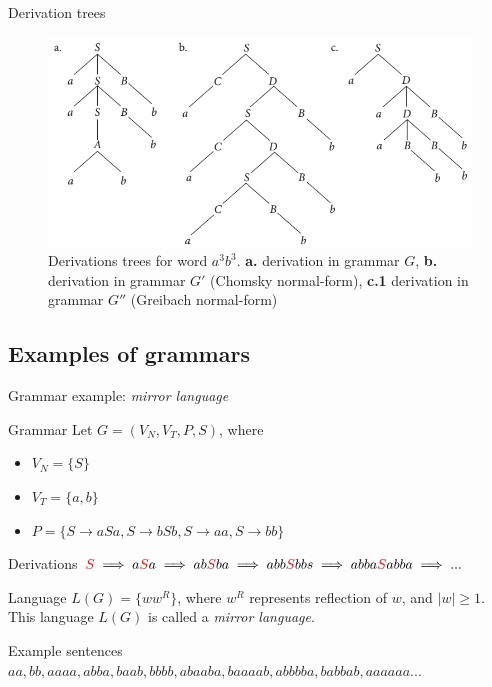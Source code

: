 \documentclass{beamer}
\begin{document}
\begin{frame}{Derivation trees}
\begin{figure}
\includegraphics[width=\textwidth]{img/derivation_tree_2.png}
\caption{\label{fig:derivation-trees}Derivations trees for word $a^3b^3$. \textbf{a.} derivation in grammar $G$, \textbf{b.} derivation in grammar $G'$ (Chomsky normal-form), \textbf{c.1} derivation in grammar $G''$ (Greibach normal-form) }
\end{figure}

\end{frame}


\subsection{Examples of grammars}

\begin{frame}{Grammar example: \textit{mirror language}}
	\begin{block}{Grammar}
		Let $G = (V_N, V_T, P, S)$, where 
		\begin{itemize}
			\item $V_N = \{S\}$
			\item $V_T = \{a,b\}$
			\item $P = \{S \rightarrow aSa, S \rightarrow bSb, S \rightarrow aa, S \rightarrow bb\}$
		\end{itemize}
	\end{block}
	
	\begin{block}{Derivations}
		$\textcolor{red}{S}\implies a\textcolor{red}{S}a \implies ab\textcolor{red}{S}ba \implies abb\textcolor{red}{S}bbs \implies abba\textcolor{red}{S}abba \implies ...$
	\end{block}
	
	\begin{block}{Language}
		$L(G) = \{ww^R\}$, where $w^R$ represents reflection of $w$, and $|w|\geq1$. This language $L(G)$ is called a \textit{mirror language}.
	\end{block}
	
	\begin{exampleblock}{Example sentences}
		$aa, bb, aaaa, abba, baab, bbbb, abaaba, baaaab, abbbba, babbab, aaaaaa...$
	\end{exampleblock}
\end{frame}
\end{document}
